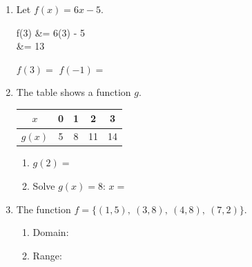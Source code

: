 \documentclass[10pt]{article}
\begin{document}

\vspace{0.12in}

\begin{enumerate}[itemsep=12pt]

\item Let $f(x) = 6x - 5$.

\begin{work}
  f(3) &= 6(3) - 5 \\
       &= 13
\end{work}

$f(3) = $ \blank{1.8cm} \qquad $f(-1) = $ \blank{1.8cm}

\item The table shows a function $g$.

\smallskip
\begin{tabular}{|c|c|c|c|c|}
\hline
$x$ & 0 & 1 & 2 & 3 \\
\hline
$g(x)$ & 5 & 8 & 11 & 14 \\
\hline
\end{tabular}
\smallskip

\begin{enumerate}[label=(\alph*), itemsep=4pt]
  \item $g(2) = $ \blank{1.8cm}
  \item Solve $g(x) = 8$: \quad $x = $ \blank{1.8cm}
\end{enumerate}

\item The function $f = \{(1, 5),\ (3, 8),\ (4, 8),\ (7, 2)\}$.

\begin{enumerate}[label=(\alph*), itemsep=4pt]
  \item Domain: \blank{4cm}
  \item Range: \blank{4cm}
\end{enumerate}

\end{enumerate}
\end{document}
